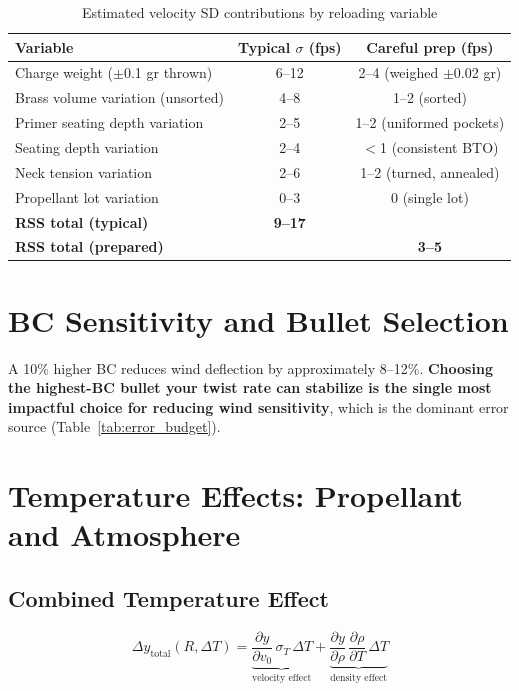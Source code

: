 \documentclass[11pt,twoside,openright]{report}
\begin{document}
\begin{table}[H]
\centering
\caption{Estimated velocity SD contributions by reloading variable}
\label{tab:sd_contributions}
\begin{tabular}{@{}lcc@{}}
\toprule
\textbf{Variable} & \textbf{Typical $\sigma$ (fps)} & \textbf{Careful prep (fps)} \\
\midrule
Charge weight ($\pm$0.1 gr thrown) & 6--12 & 2--4 (weighed $\pm$0.02 gr) \\
Brass volume variation (unsorted) & 4--8 & 1--2 (sorted) \\
Primer seating depth variation & 2--5 & 1--2 (uniformed pockets) \\
Seating depth variation & 2--4 & $<$1 (consistent BTO) \\
Neck tension variation & 2--6 & 1--2 (turned, annealed) \\
Propellant lot variation & 0--3 & 0 (single lot) \\
\midrule
\textbf{RSS total (typical)} & \textbf{9--17} & \\
\textbf{RSS total (prepared)} & & \textbf{3--5} \\
\bottomrule
\end{tabular}
\end{table}

\section{BC Sensitivity and Bullet Selection}

A 10\% higher BC reduces wind deflection by approximately 8--12\%. \textbf{Choosing the highest-BC bullet your twist rate can stabilize is the single most impactful choice for reducing wind sensitivity}, which is the dominant error source (Table~\ref{tab:error_budget}).

\section{Temperature Effects: Propellant and Atmosphere}

\subsection{Combined Temperature Effect}

\begin{equation}
  \boxed{\Delta y_{\mathrm{total}}(R,\Delta T) = \underbrace{\frac{\partial y}{\partial v_0}\,\sigma_T\,\Delta T}_{\text{velocity effect}} + \underbrace{\frac{\partial y}{\partial \rho}\,\frac{\partial \rho}{\partial T}\,\Delta T}_{\text{density effect}}}
  \label{eq:total_temp_shift}
\end{equation}
\end{document}
